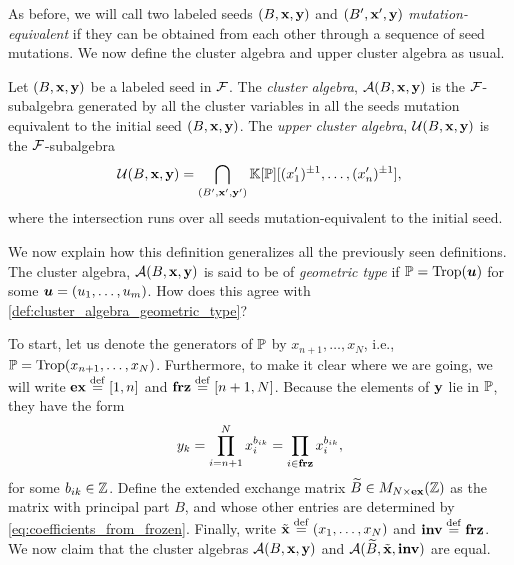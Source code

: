 As before, we will call two labeled seeds $(B, \mathbf{x}, \mathbf{y})$ and $(B', \mathbf{x}', \mathbf{y})$
\emph{mutation-equivalent} if they can be obtained from each
other through a sequence of seed mutations. We now define the cluster algebra and upper
cluster algebra as usual.
\begin{definition}

	Let $(B, \mathbf{x}, \mathbf{y})$ be a labeled seed in $\mathcal{F}$. The \emph{cluster
		algebra}, $\mathcal{A}(B,
		\mathbf{x}, \mathbf{y})$ is the $\mathcal{F}$-subalgebra generated by all
	the cluster variables in all the seeds mutation equivalent to the initial seed $(B,
		\mathbf{x}, \mathbf{y})$. The \emph{upper cluster algebra}, $\mathcal{U}(B, \mathbf{x}, \mathbf{y})$ is the $\mathcal{F}$-subalgebra
	\begin{equation*}
		\mathcal{U}(B, \mathbf{x}, \mathbf{y}) = \bigcap_{(B', \mathbf{x}', \mathbf{y}')} \mathbb{K}[\mathbb{P}][(x_1')^{\pm 1}, \dots, (x'_n)^{\pm 1}],
	\end{equation*}
	where the intersection runs over all seeds mutation-equivalent to the initial seed.
\end{definition}

We now explain how this definition generalizes all the previously seen definitions. The
cluster algebra, $\mathcal{A}(B, \mathbf{x}, \mathbf{y})$ is said to be of \emph{geometric
	type} if $\mathbb{P} = \operatorname{Trop}(\boldsymbol{u})$ for some $\boldsymbol{u} =
	(u_1, \dots, u_m)$. How does this agree with \cref{def:cluster_algebra_geometric_type}? 

To start, let us denote the generators of $\mathbb{P}$ by $x_{n+1}, \dots, x_N$, i.e., $\mathbb{P}
	= \operatorname{Trop}(x_{n+1}, \dots, x_N)$. Furthermore, to make it clear where we are going, we
will write $\mathbf{ex} \overset{\mathrm{def}}{=} [1, n]$ and $\mathbf{frz} \overset{\mathrm{def}}{=} [n+1, N]$. Because the elements of
$\mathbf{y}$ lie in $\mathbb{P}$, they have the form
\begin{equation*}\label{eq:coefficients_from_frozen}
	y_k = \prod_{i = n+1}^N x_i^{b_{ik}} = \prod_{i \in \mathbf{frz}} x_i^{b_{ik}},
\end{equation*}
%
for some $b_{ik} \in \mathbb{Z}$. Define the extended exchange matrix $\widetilde{B} \in M_{N \times
			\mathbf{ex}}(\mathbb{Z})$ as the matrix with principal part $B$, and whose other entries are
determined by \cref{eq:coefficients_from_frozen}. Finally, write $\tilde{\mathbf{x}} \overset{\mathrm{def}}{=} (x_1,
	\dots, x_N)$ and $\mathbf{inv} \overset{\mathrm{def}}{=} \mathbf{frz}$. We now claim that the cluster algebras $\mathcal{A}(B,
	\mathbf{x}, \mathbf{y})$ and $\mathcal{A}(\widetilde{B}, \tilde{\mathbf{x}}, \mathbf{inv})$ are equal.

